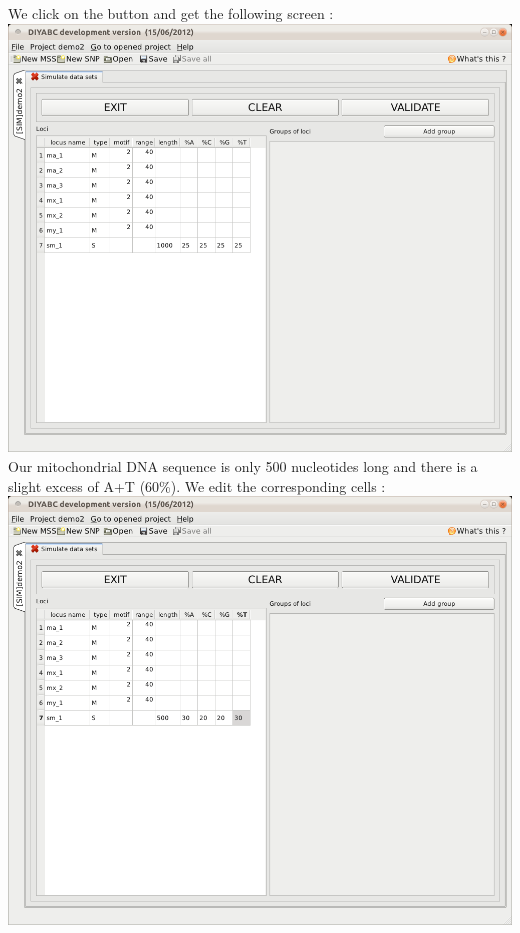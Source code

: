 We click on the  button and get the following
screen :\\


\includegraphics[scale=0.33]{gui_pictures/Capture-DIYABC-73} \\


Our mitochondrial DNA sequence is only 500 nucleotides long and there
is a slight excess of A+T (60\%). We edit the corresponding cells
: \\


\includegraphics[scale=0.33]{gui_pictures/Capture-DIYABC-74} \\


